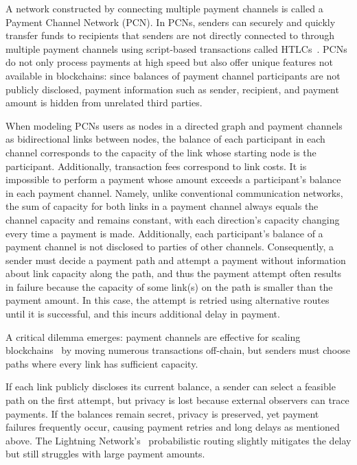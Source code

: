 \documentclass[conference]{IEEEtran}
\begin{document}
A network constructed by connecting multiple payment channels is called a Payment Channel Network (PCN).
In PCNs, senders can securely and quickly transfer funds to recipients that senders are not directly connected to through multiple payment channels using script-based transactions called HTLCs~\cite{poon_dryja_2016}.
PCNs do not only process payments at high speed but also offer unique features not available in blockchains: since balances of payment channel participants are not publicly disclosed, payment information such as sender, recipient, and payment amount is hidden from unrelated third parties.

When modeling PCNs users as nodes in a directed graph and payment channels as bidirectional links between nodes, the balance of each participant in each channel corresponds to the capacity of the link whose starting node is the participant.
Additionally, transaction fees correspond to link costs.
It is impossible to perform a payment whose amount exceeds a participant's balance in each payment channel.
Namely, unlike conventional communication networks, the sum of capacity for both links in a payment channel always equals the channel capacity and remains constant, with each direction's capacity changing every time a payment is made.
Additionally, each participant's balance of a payment channel is not disclosed to parties of other channels.
Consequently, a sender must decide a payment path and attempt a payment without information about link capacity along the path, and thus the payment attempt often results in failure because the capacity of some link(s) on the path is smaller than the payment amount. In this case, the attempt is retried using alternative routes until it is successful, and this incurs additional delay in payment.

A critical dilemma emerges: payment channels are effective for scaling blockchains~\cite{poon_dryja_2016} by moving numerous transactions off-chain, but senders must choose paths where every link has sufficient capacity.

If each link publicly discloses its current balance, a sender can select a feasible path on the first attempt, but privacy is lost because external observers can trace payments.
If the balances remain secret, privacy is preserved, yet payment failures frequently occur, causing payment retries and long delays as mentioned above.
The Lightning Network's~\cite{lnbolt} probabilistic routing slightly mitigates the delay but still struggles with large payment amounts.
\end{document}
